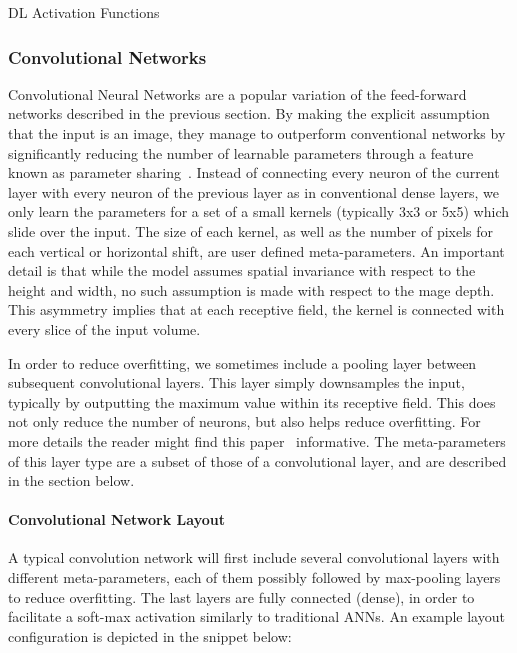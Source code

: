{\begin{option}[h]

\caption[.]{\optionCaptionSize
     DL Activation Functions
}
\label{opt:mva:dnn:activations}
\end{option}


\subsubsection{Convolutional Networks }
\label {sec:cnn}

Convolutional Neural Networks are a popular variation of the feed-forward networks described in the previous section. By making the explicit assumption that the input is an image, they manage to
outperform conventional networks by significantly reducing the number of learnable parameters through a feature known as parameter sharing~\cite{alexnet}.
Instead of connecting every neuron of the current layer with every neuron of the previous layer as in conventional dense layers,  we only learn the parameters for a set of a small kernels (typically
3x3 or 5x5) which slide over the input. The size of each kernel, as well as the number of pixels for each vertical or horizontal shift, are user defined meta-parameters. An important detail is that
while the model assumes spatial invariance with respect to the height and width, no such assumption is made with respect to the    mage depth. This asymmetry implies that at each receptive field, the kernel is connected with every slice of the input volume.

In order to reduce overfitting, we sometimes include a pooling layer between subsequent convolutional layers. This layer simply downsamples the input, typically by outputting the maximum value within
its receptive field. This does not only reduce the number of neurons, but also helps reduce overfitting. For more details the reader might find this paper~\cite{maxpool} informative. The meta-parameters of this
layer type are a subset of those of a convolutional layer, and are described in the section below.

\paragraph{Convolutional Network Layout}

A typical convolution network will first include several convolutional layers with different meta-parameters, each of them possibly followed by max-pooling layers to reduce overfitting. The last layers are fully connected (dense), in order to facilitate a soft-max activation similarly to traditional ANNs. An example layout configuration is depicted in the snippet below:


}
